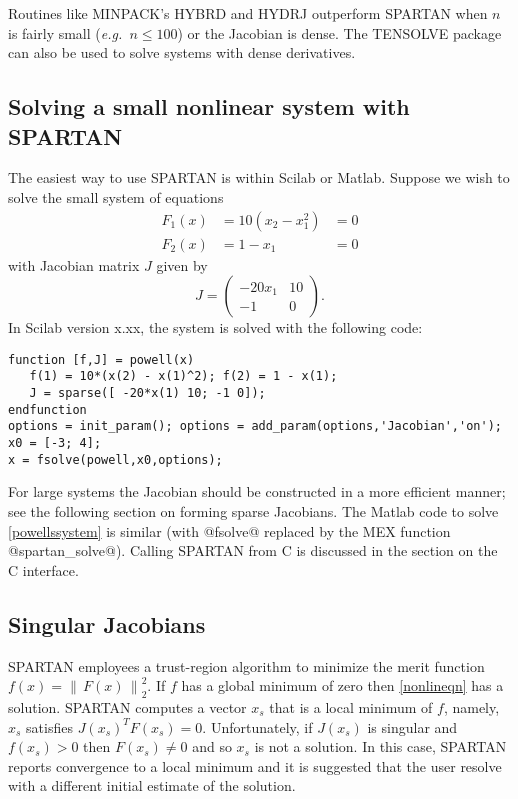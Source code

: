 \documentclass[10pt]{article}
\newcommand{\solverf}{\sffamily}
\newcommand{\norm}[1]{\left\lVert\,#1\,\right\rVert}
\newcommand{\matlab}{{\sc Matlab}}
\newcommand{\scilab}{{\sc Scilab}}
\newcommand{\spartan}{{\solverf SPARTAN}}
\newcommand{\minpack}{{\solverf MINPACK}}
\newcommand{\hybrd}{{\solverf HYBRD}}
\newcommand{\hybrj}{{\solverf HYDRJ}}
\newcommand{\tensolve}{{\solverf TENSOLVE}}
\begin{document}
Routines like \minpack's \cite{minpack} \hybrd{} and \hybrj{}
outperform \spartan{} when $n$ is fairly small (\emph{e.g.\ }$n \le
100$) or the Jacobian is dense. The \tensolve{} \cite{tensolve}
package can also be used to solve systems with dense derivatives.

\subsection*{Solving a small nonlinear system with \spartan}

The easiest way to use \spartan{} is within \scilab{} or \matlab. Suppose
we wish to solve the small system of equations \cite{powelldogleg}
\begin{equation}
\begin{aligned}
F_1(x) &= 10 (x_2 - x_1^2) &= 0 \\
F_2(x) &= 1 - x_1          &= 0 
\end{aligned}
\label{powellssystem}
\end{equation}
with Jacobian matrix $J$ given by 
\begin{equation}
J =  \begin{pmatrix} -20 x_1 & 10 \\ -1 & 0 \end{pmatrix}.
\label{powellsystemjacobian}
\end{equation}
In \scilab{} version x.xx, the system is solved with the following
code: 
\begin{Verbatim}[fontsize=\small]
function [f,J] = powell(x) 
   f(1) = 10*(x(2) - x(1)^2); f(2) = 1 - x(1);
   J = sparse([ -20*x(1) 10; -1 0]);
endfunction 
options = init_param(); options = add_param(options,'Jacobian','on');
x0 = [-3; 4]; 
x = fsolve(powell,x0,options);
\end{Verbatim}
For large systems the Jacobian should be constructed in a more
efficient manner; see the following section on forming sparse
Jacobians. The \matlab{} code to solve \eqref{powellssystem}
is similar (with @fsolve@ replaced by the MEX function
@spartan_solve@). Calling \spartan{} from C is discussed in the
section on the C interface.

\subsection*{Singular Jacobians}
\spartan{} employees a trust-region algorithm to minimize the merit
function $f(x) = \norm{F(x)}_2^2$. If $f$ has a global minimum of zero
then \eqref{nonlineqn} has a solution. \spartan{} computes a vector
$x_s$ that is a local minimum of $f$, namely, $x_s$ satisfies
$J(x_s)^T F(x_s) = 0$. Unfortunately, if $J(x_s)$ is singular and
$f(x_s) > 0$ then $F(x_s) \ne 0$ and so $x_s$ is not a solution. In
this case, \spartan{} reports convergence to a local minimum and it is
suggested that the user resolve with a different initial estimate of
the solution.
\end{document}
